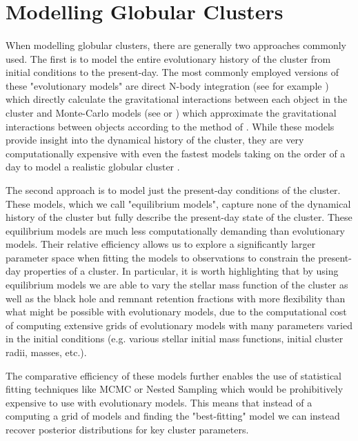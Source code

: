 \section{Modelling Globular Clusters}

\paragraph{}


When modelling globular clusters, there are generally two approaches commonly used. The first is to
model the entire evolutionary history of the cluster from initial conditions to the present-day. The
most commonly employed versions of these "evolutionary models" are direct N-body integration (see
for example \citealt{Baumgardt2017a}) which directly calculate the gravitational interactions
between each object in the cluster and Monte-Carlo models (see \citealt{Rodriguez2021} or
\citealt{Hypki2013}) which approximate the gravitational interactions between objects according to
the method of \citet{Henon1971}. While these models provide insight into the dynamical history of
the cluster, they are very computationally expensive with even the fastest models taking on the
order of a day to model a realistic globular cluster \citep{Rodriguez2021}.

The second approach is to model just the present-day conditions of the cluster. These models, which
we call "equilibrium models", capture none of the dynamical history of the cluster but fully
describe the present-day state of the cluster. These equilibrium models are much less
computationally demanding than evolutionary models. Their relative efficiency allows us to explore a
significantly larger parameter space when fitting the models to observations to constrain the
present-day properties of a cluster. In particular, it is worth highlighting that by using
equilibrium models we are able to vary the stellar mass function of the cluster as well as the black
hole and remnant retention fractions with more flexibility than what might be possible with
evolutionary models, due to the computational cost of computing extensive grids of evolutionary
models with many parameters varied in the initial conditions (e.g. various stellar initial mass
functions, initial cluster radii, masses, etc.).

The comparative efficiency of these models further enables the use of statistical fitting techniques
like MCMC or Nested Sampling which would be prohibitively expensive to use with evolutionary models.
This means that instead of a computing a grid of models and finding the "best-fitting" model we can
instead recover posterior distributions for key cluster parameters.


